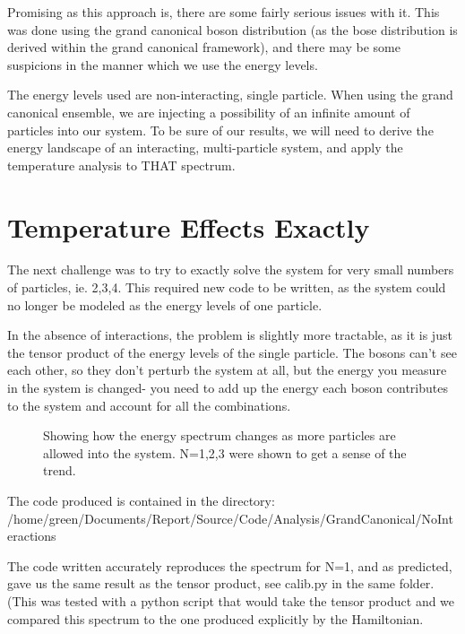 \documentclass[12pt]{article}
\begin{document}
Promising as this approach is, there are some fairly serious issues with it.
This was done using the grand canonical boson distribution (as the
bose distribution is derived within the grand canonical framework), and there
may be some suspicions in the manner which we use the energy levels.

The energy levels used are non-interacting, single particle.
When using the grand canonical ensemble, we are injecting a possibility of an 
infinite amount of particles into our system. To be sure of our results, we will need
to derive the energy landscape of an interacting, multi-particle system, and
apply the temperature analysis to THAT spectrum.

\section{Temperature Effects Exactly}
The next challenge was to try to exactly solve the system for very
small numbers of particles, ie. 2,3,4. 
This required new code to be written, as the system could
no longer be modeled as the energy levels of one particle.

In the absence of interactions, the problem is slightly more
tractable, as it is just the tensor product of the energy
levels of the single particle. The bosons can't see each other,
so they don't perturb the system at all, but the energy you
measure in the system is changed- you need to add up the energy
each boson contributes to the system and account for all the combinations.
\begin{figure}[H]
	\centerline{}
	\caption{ Showing how the energy spectrum changes as more particles
	are allowed into the system. N=1,2,3 were shown to get a sense of the trend.    }
	\label{NEnergyfig}
\end{figure}

The code produced is contained in the directory:
\\/home/green/Documents/Report/Source/Code/Analysis/GrandCanonical/NoInteractions


The code written accurately reproduces the spectrum for N=1, and
as predicted, gave us the same result as the tensor product, see calib.py in
the same folder.
(This was tested with a python script that would take the
tensor product and we compared this spectrum to the one
produced explicitly by the Hamiltonian.
\end{document}
